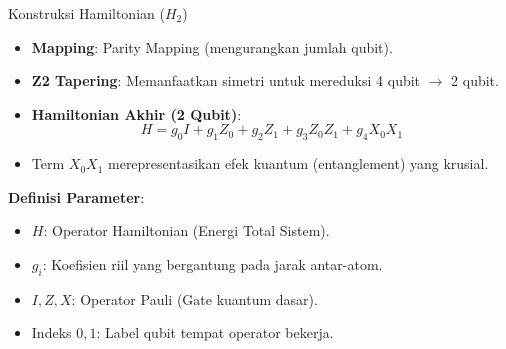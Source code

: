 \documentclass{beamer}
\begin{document}
\begin{frame}{Konstruksi Hamiltonian ($H_2$)}
    \begin{itemize}
        \item \textbf{Mapping}: Parity Mapping (mengurangkan jumlah qubit).
        \item \textbf{Z2 Tapering}: Memanfaatkan simetri untuk mereduksi 4 qubit $\rightarrow$ 2 qubit.
        \item \textbf{Hamiltonian Akhir (2 Qubit)}:
        \begin{equation}
            H = g_0 I + g_1 Z_0 + g_2 Z_1 + g_3 Z_0 Z_1 + g_4 X_0 X_1
        \end{equation}
        \item Term $X_0 X_1$ merepresentasikan efek kuantum (entanglement) yang krusial.
    \end{itemize}
    \vspace{0.3cm}
    \textbf{Definisi Parameter}:
    \footnotesize
    \begin{itemize}
        \item $H$: Operator Hamiltonian (Energi Total Sistem).
        \item $g_i$: Koefisien riil yang bergantung pada jarak antar-atom.
        \item $I, Z, X$: Operator Pauli (Gate kuantum dasar).
        \item Indeks $0, 1$: Label qubit tempat operator bekerja.
    \end{itemize}
\end{frame}
\end{document}

